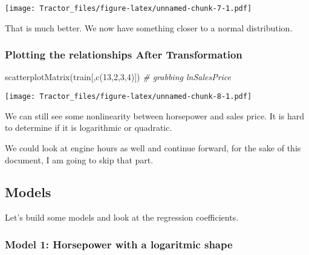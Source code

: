 \documentclass[
]{article}
\newenvironment{Shaded}{\begin{snugshade}}{\end{snugshade}}
\newcommand{\CommentTok}[1]{\textcolor[rgb]{0.56,0.35,0.01}{\textit{#1}}}
\newcommand{\DecValTok}[1]{\textcolor[rgb]{0.00,0.00,0.81}{#1}}
\newcommand{\FunctionTok}[1]{\textcolor[rgb]{0.00,0.00,0.00}{#1}}
\newcommand{\NormalTok}[1]{#1}
\newcommand{\OtherTok}[1]{\textcolor[rgb]{0.56,0.35,0.01}{#1}}
\newcommand{\SpecialCharTok}[1]{\textcolor[rgb]{0.00,0.00,0.00}{#1}}
\begin{document}
\texttt{[image: Tractor\_files/figure-latex/unnamed-chunk-7-1.pdf]}

That is much better. We now have something closer to a normal
distribution.

\hypertarget{plotting-the-relationships-after-transformation}{%
\subsubsection{Plotting the relationships After
Transformation}\label{plotting-the-relationships-after-transformation}}

\begin{Shaded}
\begin{Highlighting}[]
\FunctionTok{scatterplotMatrix}\NormalTok{(train[,}\FunctionTok{c}\NormalTok{(}\DecValTok{13}\NormalTok{,}\DecValTok{2}\NormalTok{,}\DecValTok{3}\NormalTok{,}\DecValTok{4}\NormalTok{)]) }\CommentTok{\# grabbing lnSalesPrice}
\end{Highlighting}
\end{Shaded}

\texttt{[image: Tractor\_files/figure-latex/unnamed-chunk-8-1.pdf]}

We can still see some nonlinearity between horsepower and sales price.
It is hard to determine if it is logarithmic or quadratic.

\begin{Shaded}
\end{Shaded}

We could look at engine hours as well and continue forward, for the sake
of this document, I am going to skip that part.

\hypertarget{models}{%
\subsection{Models}\label{models}}

Let's build some models and look at the regression coefficients.

\hypertarget{model-1-horsepower-with-a-logaritmic-shape}{%
\subsubsection{Model 1: Horsepower with a logaritmic
shape}\label{model-1-horsepower-with-a-logaritmic-shape}}
\end{document}
